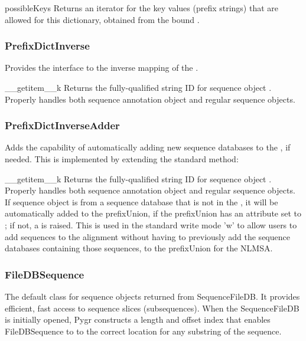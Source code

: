 \documentclass{howto}
\begin{document}
\begin{funcdesc}{possibleKeys}{}
  Returns an iterator for the key values (prefix strings) that are allowed for 
  this dictionary, obtained from the bound .
\end{funcdesc}

\subsubsection{PrefixDictInverse}
Provides the interface to the inverse mapping of the .
\begin{funcdesc}{__getitem__}{k}
  Returns the fully-qualified string ID for sequence object .  
  Properly handles both sequence annotation object and regular sequence
  objects.
\end{funcdesc}

\subsubsection{PrefixDictInverseAdder}
Adds the capability of automatically adding new sequence databases to the
, if needed.  This is implemented by extending
the standard  method:
\begin{funcdesc}{__getitem__}{k}
  Returns the fully-qualified string ID for sequence object .  
  Properly handles both sequence annotation object and regular sequence
  objects.  If sequence object  is from a sequence database that
  is not in the , it will be automatically added
  to the prefixUnion, if the prefixUnion has an  attribute
  set to ; if not, a  is raised.
  This is used in the standard  write mode 'w'
  to allow users to add sequences to the alignment without having to 
  previously add the sequence databases containing those sequences, 
  to the prefixUnion for the NLMSA.
\end{funcdesc}



\subsubsection{FileDBSequence}
The default class for sequence objects returned from SequenceFileDB.  
It provides efficient, fast access to sequence slices (subsequences).  
When the SequenceFileDB is initially opened,
Pygr constructs a length and offset index that enables FileDBSequence to 
to the correct location for any substring of the sequence.  
\end{document}
